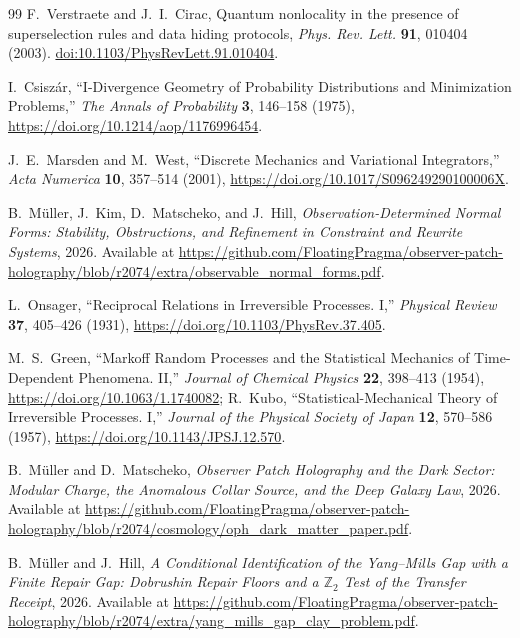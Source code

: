 \documentclass[11pt]{article}
\begin{document}
\begin{thebibliography}{99}
F.~Verstraete and J.~I.~Cirac,
Quantum nonlocality in the presence of superselection rules and data
hiding protocols, \emph{Phys. Rev. Lett.} \textbf{91}, 010404 (2003).
\href{https://doi.org/10.1103/PhysRevLett.91.010404}{doi:10.1103/PhysRevLett.91.010404}.

I.~Csisz\'ar,
``I-Divergence Geometry of Probability Distributions and Minimization Problems,''
\emph{The Annals of Probability} \textbf{3}, 146--158 (1975),
\url{https://doi.org/10.1214/aop/1176996454}.

J.~E.~Marsden and M.~West,
``Discrete Mechanics and Variational Integrators,''
\emph{Acta Numerica} \textbf{10}, 357--514 (2001),
\url{https://doi.org/10.1017/S096249290100006X}.

B.~M\"uller, J.~Kim, D.~Matscheko, and J.~Hill,
\emph{Observation-Determined Normal Forms: Stability, Obstructions, and Refinement in Constraint
and Rewrite Systems},
2026.
Available at \url{https://github.com/FloatingPragma/observer-patch-holography/blob/r2074/extra/observable_normal_forms.pdf}.

L.~Onsager,
``Reciprocal Relations in Irreversible Processes. I,''
\emph{Physical Review} \textbf{37}, 405--426 (1931),
\url{https://doi.org/10.1103/PhysRev.37.405}.

M.~S.~Green, ``Markoff Random Processes and the Statistical Mechanics of
Time-Dependent Phenomena. II,'' \emph{Journal of Chemical Physics}
\textbf{22}, 398--413 (1954), \url{https://doi.org/10.1063/1.1740082};
R.~Kubo, ``Statistical-Mechanical Theory of Irreversible Processes. I,''
\emph{Journal of the Physical Society of Japan} \textbf{12}, 570--586
(1957), \url{https://doi.org/10.1143/JPSJ.12.570}.

B.~M\"uller and D.~Matscheko,
\emph{Observer Patch Holography and the Dark Sector: Modular Charge,
the Anomalous Collar Source, and the Deep Galaxy Law},
2026.
Available at \url{https://github.com/FloatingPragma/observer-patch-holography/blob/r2074/cosmology/oph_dark_matter_paper.pdf}.

B.~M\"uller and J.~Hill,
\emph{A Conditional Identification of the Yang--Mills Gap with a Finite Repair Gap: Dobrushin Repair Floors and a \(\mathbb Z_2\) Test of the Transfer Receipt},
2026.
Available at \url{https://github.com/FloatingPragma/observer-patch-holography/blob/r2074/extra/yang_mills_gap_clay_problem.pdf}.


\end{thebibliography}
\end{document}
